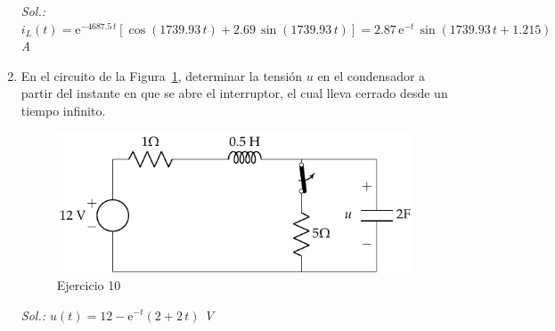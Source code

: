 \begin{enumerate}
	   \emph{Sol.: $i_L(t)= \mathrm{e}^{-4687.5\,t}\left[\cos(1739.93\,t)+2.69\,\sin(1739.93\,t)\right]=2.87\,\mathrm{e}^{-t}\,\sin\left(1739.93\,t+1.215\right)$ A}
	    
\item En el circuito de la Figura~\ref{fig.ej11_BT4}, determinar la tensión $u$ en el condensador a partir del instante en que se abre el interruptor, el cual lleva cerrado desde un tiempo infinito.
\begin{figure}[H]
    \centering
    \includegraphics{../figs/ej11_BT4.pdf}
    \caption{Ejercicio 10}
    \label{fig.ej11_BT4}
\end{figure}	 
\emph{Sol.: $u(t)=12-\mathrm{e}^{-t}\left(2+2\,t\right)$ V}

	    
	    
	\end{enumerate}
 
